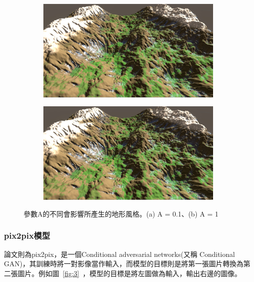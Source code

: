 \documentclass[a4paper, 12pt]{article}
\begin{document}
\begin{figure}[htbp]
    \begin{subfigure}{0.45\textwidth}
        \includegraphics[width=\linewidth]{fig/2a.jpg}
        \caption{} \label{fig:2a}
    \end{subfigure}%
    \hspace*{\fill}   %
    \begin{subfigure}{0.45\textwidth}
        \includegraphics[width=\linewidth]{fig/2a.jpg}
        \caption{} \label{fig:2b}
    \end{subfigure}%
    \caption{參數A的不同會影響所產生的地形風格。(a) A = 0.1、(b) A = 1} \label{fig:2}
\end{figure}

\subsubsection{pix2pix模型}
論文\cite{isola2017image}則為pix2pix，是一個Conditional adversarial networks(又稱 Conditional GAN)，其訓練時將一對影像當作輸入，而模型的目標則是將第一張圖片轉換為第二張圖片。例如圖~\ref{fig:3}~，模型的目標是將左圖做為輸入，輸出右邊的圖像。
\end{document}
